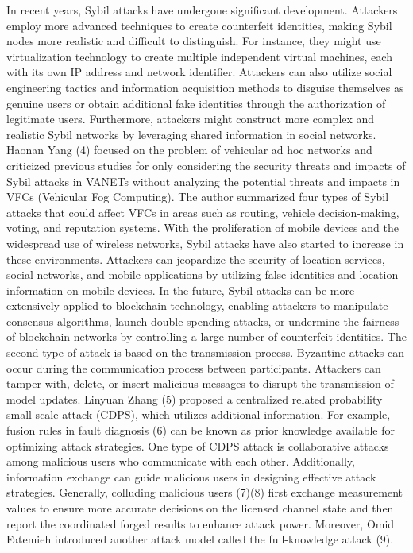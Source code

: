 \documentclass[conference]{IEEEtran}
\begin{document}
In recent years, Sybil attacks have undergone significant development. Attackers employ more advanced techniques to create counterfeit identities, making Sybil nodes more realistic and difficult to distinguish. For instance, they might use virtualization technology to create multiple independent virtual machines, each with its own IP address and network identifier. Attackers can also utilize social engineering tactics and information acquisition methods to disguise themselves as genuine users or obtain additional fake identities through the authorization of legitimate users. Furthermore, attackers might construct more complex and realistic Sybil networks by leveraging shared information in social networks. Haonan Yang (4) focused on the problem of vehicular ad hoc networks and criticized previous studies for only considering the security threats and impacts of Sybil attacks in VANETs without analyzing the potential threats and impacts in VFCs (Vehicular Fog Computing). The author summarized four types of Sybil attacks that could affect VFCs in areas such as routing, vehicle decision-making, voting, and reputation systems.
With the proliferation of mobile devices and the widespread use of wireless networks, Sybil attacks have also started to increase in these environments. Attackers can jeopardize the security of location services, social networks, and mobile applications by utilizing false identities and location information on mobile devices. In the future, Sybil attacks can be more extensively applied to blockchain technology, enabling attackers to manipulate consensus algorithms, launch double-spending attacks, or undermine the fairness of blockchain networks by controlling a large number of counterfeit identities.
The second type of attack is based on the transmission process. Byzantine attacks can occur during the communication process between participants. Attackers can tamper with, delete, or insert malicious messages to disrupt the transmission of model updates.
Linyuan Zhang (5) proposed a centralized related probability small-scale attack (CDPS), which utilizes additional information. For example, fusion rules in fault diagnosis (6) can be known as prior knowledge available for optimizing attack strategies. One type of CDPS attack is collaborative attacks among malicious users who communicate with each other. Additionally, information exchange can guide malicious users in designing effective attack strategies. Generally, colluding malicious users (7)(8) first exchange measurement values to ensure more accurate decisions on the licensed channel state and then report the coordinated forged results to enhance attack power. Moreover, Omid Fatemieh introduced another attack model called the full-knowledge attack (9).
\end{document}
